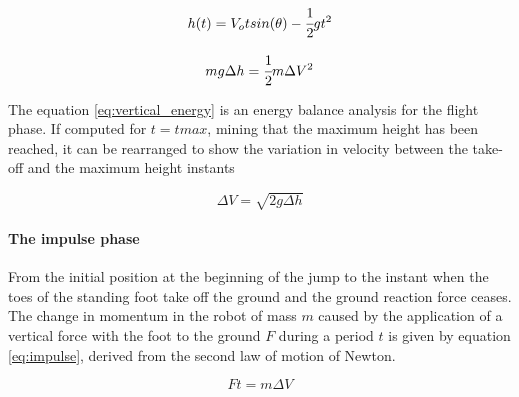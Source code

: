 \begin{equation}
\label{eq:vertical_motion}	
	h(t) = V_o t sin(\theta) - \cfrac{1}{2} g t^2 
\end{equation}

\begin{equation}
\label{eq:vertical_energy}
	m g \Delta h = \cfrac{1}{2} m \Delta V^2
\end{equation}

The equation \ref{eq:vertical_energy} is an energy balance analysis for the flight phase. 
If computed for $t=tmax$, mining that the maximum height has been reached, it can be rearranged to show the variation in velocity between the take-off and the maximum height instants

\begin{equation}
	\Delta V = \sqrt{2 g \Delta h}
\end{equation}

\paragraph{The impulse phase}
From the initial position at the beginning of the jump to the instant when the toes of the standing foot take off the ground and the ground reaction force ceases.
The change in momentum in the robot of mass $m$ caused by the application of a vertical force with the foot to the ground $F$ during a period $t$ is given by equation \ref{eq:impulse}, derived from the second law of motion of Newton.


\begin{equation}
\label{eq:impulse}
	F  t = m  \Delta V	
\end{equation} 



